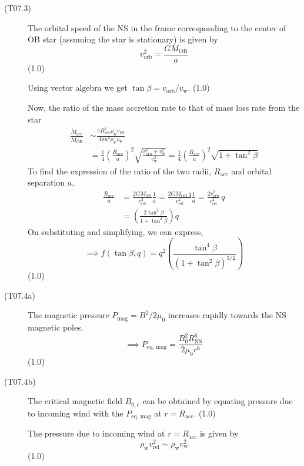 \begin{description}
\item[(T07.3)] The orbital speed of the NS in the frame corresponding to the
  center of OB star (assuming the star is stationary) is given by
  \[
    v_{\mathrm{orb}}^2 = \frac{G M_{\mathrm{OB}}}{a}
  \]
  \hfill(1.0)

  Using vector algebra we get
  $\tan\beta = v_{\mathrm{orb}}/v_{\mathrm{w}}$. \hfill(1.0)

  Now, the ratio of the mass accretion rate to that of mass loss rate from the
  star
  \begin{align*}
    \frac{\dot{M}_{\mathrm{acc}}}{\dot{M}_{\mathrm{OB}}}
      &\sim \frac{\pi R_{\mathrm{acc}}^2 \rho_{\mathrm{w}} v_{\mathrm{rel}}}
        {4\pi a^2 \rho_{\mathrm{w}} v_{\mathrm{w}}}\\
      &= \frac{1}{4}\left(\frac{R_{\mathrm{acc}}}{a}\right)^2
        \sqrt{\frac{v_{\mathrm{orb}}^2 + v_{\mathrm{w}}^2}{v_{\mathrm{w}}^2}}
       = \frac{1}{4}\left(\frac{R_{\mathrm{acc}}}{a}\right)^2
        \sqrt{1 + \tan^2\beta}
      \tag*{(1.0)}
  \end{align*}
  To find the expression of the ratio of the two radii, $R_{\mathrm{acc}}$ and
  orbital separation $a$,
  \begin{align*}
    \frac{R_{\mathrm{acc}}}{a}
      &= \frac{2 G M_{\mathrm{NS}}}{v_{\mathrm{rel}}^2}\frac{1}{a}
       = \frac{2 G M_{\mathrm{OB}}\,q}{v_{\mathrm{rel}}^2}\frac{1}{a}
       = \frac{2 v_{\mathrm{orb}}^2}{v_{\mathrm{rel}}^2}\,q
      \tag*{(1.0)}\\
      &= \left(\frac{2\tan^2\beta}{1 + \tan^2\beta}\right) q
      \tag*{(1.0)}
  \end{align*}
  On substituting and simplifying, we can express,
  \[
    \implies f(\tan\beta, q)
      = q^2 \left(\frac{\tan^4\beta}{(1 + \tan^2\beta)^{3/2}}\right)
  \]
  \hfill(1.0)

\item[(T07.4a)] The magnetic pressure $P_{\mathrm{mag}} = B^2/2\mu_0$
  increases rapidly towards the NS magnetic poles.
  \[
    \implies P_{\mathrm{eq,\,mag}}
      = \frac{B_0^2 R_{\mathrm{NS}}^6}{2\mu_0 r^6}
  \]
  \hfill(1.0)

\item[(T07.4b)] The critical magnetic field $B_{0,\mathrm{c}}$ can be obtained
  by equating pressure due to incoming wind with the $P_{\mathrm{eq,\,mag}}$ at
  $r = R_{\mathrm{acc}}$. \hfill(1.0)

  The pressure due to incoming wind at $r = R_{\mathrm{acc}}$ is given by
  \[
    \rho_{\mathrm{w}} v_{\mathrm{rel}}^2 \sim \rho_{\mathrm{w}} v_{\mathrm{w}}^2
  \]
  \hfill(1.0)


\end{description}
